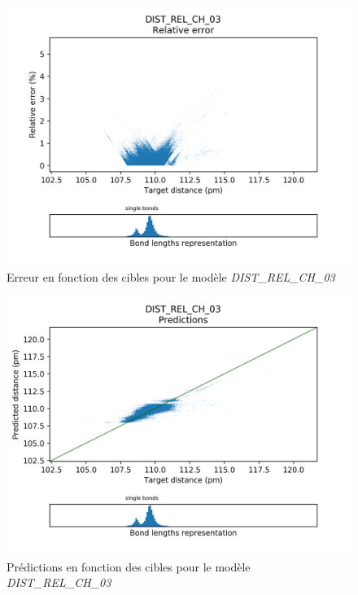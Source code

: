 \begin{figure}[!h]
	\centering
	
	\includegraphics[scale=0.8]{../figures/DIST_REL_CH_03/DIST_REL_CH_03_distrib_rmse_dist.png}	
	
	\caption{Erreur en fonction des cibles pour le modèle \emph{DIST\_REL\_CH\_03}}
\end{figure}

\begin{figure}[!h]
	\centering
	
	\includegraphics[scale=0.8]{../figures/DIST_REL_CH_03/DIST_REL_CH_03_preds_targets.png}	
	
	\caption{Prédictions en fonction des cibles pour le modèle \emph{DIST\_REL\_CH\_03}}
	
\end{figure}

